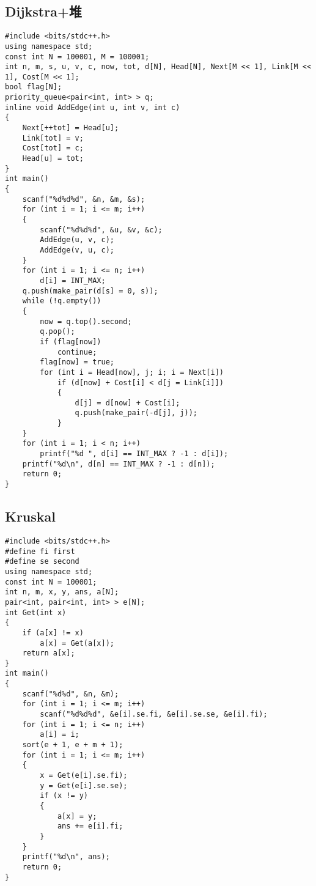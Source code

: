 \documentclass[a4paper]{article}
\begin{document}
\subsection{Dijkstra+堆}
\begin{lstlisting}
#include <bits/stdc++.h>
using namespace std;
const int N = 100001, M = 100001;
int n, m, s, u, v, c, now, tot, d[N], Head[N], Next[M << 1], Link[M << 1], Cost[M << 1];
bool flag[N];
priority_queue<pair<int, int> > q;
inline void AddEdge(int u, int v, int c)
{
    Next[++tot] = Head[u];
    Link[tot] = v;
    Cost[tot] = c;
    Head[u] = tot;
}
int main()
{
    scanf("%d%d%d", &n, &m, &s);
    for (int i = 1; i <= m; i++)
    {
        scanf("%d%d%d", &u, &v, &c);
        AddEdge(u, v, c);
        AddEdge(v, u, c);
    }
    for (int i = 1; i <= n; i++)
        d[i] = INT_MAX;
    q.push(make_pair(d[s] = 0, s));
    while (!q.empty())
    {
        now = q.top().second;
        q.pop();
        if (flag[now])
            continue;
        flag[now] = true;
        for (int i = Head[now], j; i; i = Next[i])
            if (d[now] + Cost[i] < d[j = Link[i]])
            {
                d[j] = d[now] + Cost[i];
                q.push(make_pair(-d[j], j));
            }
    }
    for (int i = 1; i < n; i++)
        printf("%d ", d[i] == INT_MAX ? -1 : d[i]);
    printf("%d\n", d[n] == INT_MAX ? -1 : d[n]);
    return 0;
}
\end{lstlisting}
\subsection{Kruskal}
\begin{lstlisting}
#include <bits/stdc++.h>
#define fi first
#define se second
using namespace std;
const int N = 100001;
int n, m, x, y, ans, a[N];
pair<int, pair<int, int> > e[N];
int Get(int x)
{
	if (a[x] != x)
		a[x] = Get(a[x]);
	return a[x];
}
int main()
{
	scanf("%d%d", &n, &m);
	for (int i = 1; i <= m; i++)
		scanf("%d%d%d", &e[i].se.fi, &e[i].se.se, &e[i].fi);
    for (int i = 1; i <= n; i++)
        a[i] = i;
	sort(e + 1, e + m + 1);
	for (int i = 1; i <= m; i++)
	{
		x = Get(e[i].se.fi);
		y = Get(e[i].se.se);
		if (x != y)
		{
			a[x] = y;
			ans += e[i].fi;
		}
	}
	printf("%d\n", ans);
	return 0;
}
\end{lstlisting}
\end{document}
